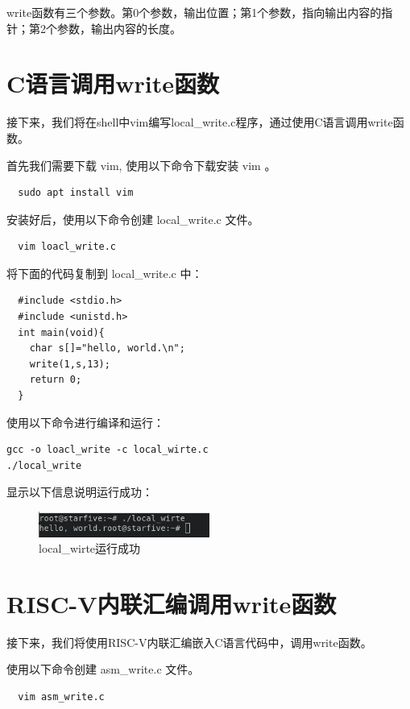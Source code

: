 \documentclass[lang=cn,10pt]{elegantbook}
\begin{document}
write函数有三个参数。第0个参数，输出位置；第1个参数，指向输出内容的指针；第2个参数，输出内容的长度。

\section{C语言调用write函数}
接下来，我们将在shell中vim编写local\_write.c程序，通过使用C语言调用write函数。

首先我们需要下载 vim, 使用以下命令下载安装 vim 。

\begin{lstlisting}
  sudo apt install vim
\end{lstlisting}

安装好后，使用以下命令创建 local\_write.c 文件。

\begin{lstlisting}
  vim loacl_write.c
\end{lstlisting}

将下面的代码复制到 local\_write.c 中：

\begin{lstlisting}
  #include <stdio.h>
  #include <unistd.h>
  int main(void){
    char s[]="hello, world.\n";
    write(1,s,13);
    return 0;
  }
\end{lstlisting}

使用以下命令进行编译和运行：

\begin{lstlisting}
gcc -o loacl_write -c local_wirte.c
./local_write
\end{lstlisting}

显示以下信息说明运行成功：
\begin{figure}[htbp]
  \centering
  \includegraphics[width=0.5\textwidth]{image/image-20231105134051213.png}
  \caption{local\_wirte运行成功}
\end{figure}

\section{RISC-V内联汇编调用write函数}
接下来，我们将使用RISC-V内联汇编嵌入C语言代码中，调用write函数。

使用以下命令创建 asm\_write.c 文件。

\begin{lstlisting}
  vim asm_write.c
\end{lstlisting}
\end{document}

